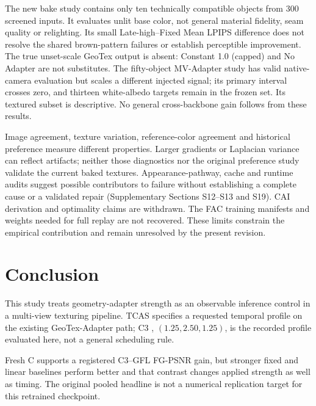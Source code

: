 \documentclass[times,twocolumn,final]{elsarticle}
\providecommand{\DIFadd}[1]{{\protect\color{blue} \sf #1}} %
\providecommand{\DIFaddbegin}{} %
\providecommand{\DIFaddend}{} %
\begin{document}
\DIFadd{The new bake study contains only ten technically compatible objects from 300 screened inputs. It evaluates unlit base color, not general material fidelity, seam quality or relighting. Its small Late-high--Fixed Mean LPIPS difference does not resolve the shared brown-pattern failures or establish perceptible improvement. The true unset-scale GeoTex output is absent: Constant 1.0 (capped) and No Adapter are not substitutes. The fifty-object MV-Adapter study has valid native-camera evaluation but scales a different injected signal; its primary interval crosses zero, and thirteen white-albedo targets remain in }\DIFaddend the   \DIFaddbegin \DIFadd{frozen set. Its textured subset is descriptive. No general cross-backbone gain follows from these results.
}\DIFaddend 

  \DIFaddbegin \DIFadd{Image agreement, texture variation, reference-color agreement and historical preference measure different properties. Larger gradients or Laplacian variance can reflect artifacts; neither those diagnostics nor the original preference study validate the current baked textures. Appearance-pathway, cache and runtime audits suggest possible contributors to failure without establishing a complete cause or a validated repair (Supplementary Sections S12--S13 and S19). CAI derivation and optimality claims are withdrawn. The FAC training manifests and weights needed for full replay are not recovered. These limits constrain the empirical contribution and remain unresolved by the present revision.
}\DIFaddend 

\section{Conclusion}
\label{sec:conclusion}

  \DIFaddbegin \DIFadd{This study treats geometry-adapter strength as an observable inference control in a }\DIFaddend multi-view  
 \DIFaddbegin \DIFadd{texturing pipeline. TCAS specifies a requested temporal profile on the existing GeoTex-Adapter path; }\DIFaddend C3  \DIFaddbegin \DIFadd{, $(1.25,2.50,1.25)$, is the recorded profile evaluated here, not a general scheduling rule.
}\DIFaddend 

  \DIFaddbegin \DIFadd{Fresh C supports a registered C3--GFL FG-PSNR gain, but stronger fixed and linear baselines perform better and that contrast changes applied strength as well as timing. The original pooled headline is not a numerical replication target for this retrained checkpoint.
}\DIFaddend 
\end{document}
